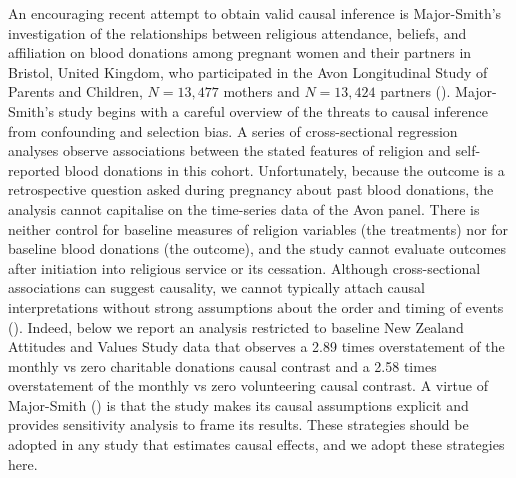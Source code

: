 \documentclass[
  single column]{article}
\begin{document}
An encouraging recent attempt to obtain valid causal inference is
Major-Smith's investigation of the relationships between religious
attendance, beliefs, and affiliation on blood donations among pregnant
women and their partners in Bristol, United Kingdom, who participated in
the Avon Longitudinal Study of Parents and Children, \(N=13,477\)
mothers and \(N=13,424\) partners
(). Major-Smith's
study begins with a careful overview of the threats to causal inference
from confounding and selection bias. A series of cross-sectional
regression analyses observe associations between the stated features of
religion and self-reported blood donations in this cohort.
Unfortunately, because the outcome is a retrospective question asked
during pregnancy about past blood donations, the analysis cannot
capitalise on the time-series data of the Avon panel. There is neither
control for baseline measures of religion variables (the treatments) nor
for baseline blood donations (the outcome), and the study cannot
evaluate outcomes after initiation into religious service or its
cessation. Although cross-sectional associations can suggest causality,
we cannot typically attach causal interpretations without strong
assumptions about the order and timing of events
(). Indeed, below we
report an analysis restricted to baseline New Zealand Attitudes and
Values Study data that observes a 2.89 times overstatement of the
monthly vs zero charitable donations causal contrast and a 2.58 times
overstatement of the monthly vs zero volunteering causal contrast. A
virtue of Major-Smith () is that
the study makes its causal assumptions explicit and provides sensitivity
analysis to frame its results. These strategies should be adopted in any
study that estimates causal effects, and we adopt these strategies here.
\end{document}
